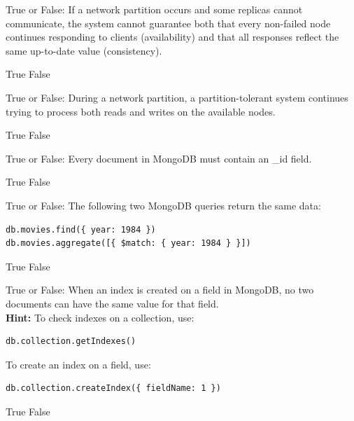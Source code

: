 \documentclass[12pt,answers]{exam}
\begin{document}
\begin{questions}
\begin{minipage}{\linewidth}
\question[2]
True or False: If a network partition occurs and some replicas cannot communicate, the system cannot guarantee both that every non-failed node continues responding to clients (availability) and that all responses reflect the same up-to-date value (consistency).
\begin{checkboxes}
    \CorrectChoice True
    \choice False
\end{checkboxes}
\end{minipage}

\begin{minipage}{\linewidth}
\question[2]
True or False: During a network partition, a partition-tolerant system continues trying to process both reads and writes on the available nodes.
\begin{checkboxes}
    \CorrectChoice True
    \choice False
\end{checkboxes}
\end{minipage}

\begin{minipage}{\linewidth}
\question[2]
True or False: Every document in MongoDB must contain an \_id field.
\begin{checkboxes}
    \CorrectChoice True
    \choice False
\end{checkboxes}
\end{minipage}

\begin{minipage}{\linewidth}
\question[2]
True or False: The following two MongoDB queries return the same data:
\begin{verbatim}
db.movies.find({ year: 1984 })
db.movies.aggregate([{ $match: { year: 1984 } }])
\end{verbatim}
\begin{checkboxes}
    \CorrectChoice True
    \choice False
\end{checkboxes}
\end{minipage}

\begin{minipage}{\linewidth}
\question[2]
True or False: When an index is created on a field in MongoDB, no two documents can have the same value for that field.\\
\textbf{Hint:}
To check indexes on a collection, use:
\begin{verbatim}
db.collection.getIndexes()
\end{verbatim}

To create an index on a field, use:
\begin{verbatim}
db.collection.createIndex({ fieldName: 1 })
\end{verbatim}
\begin{checkboxes}
    \choice True
    \CorrectChoice False
\end{checkboxes}
\end{minipage}


\end{questions}
\end{document}
